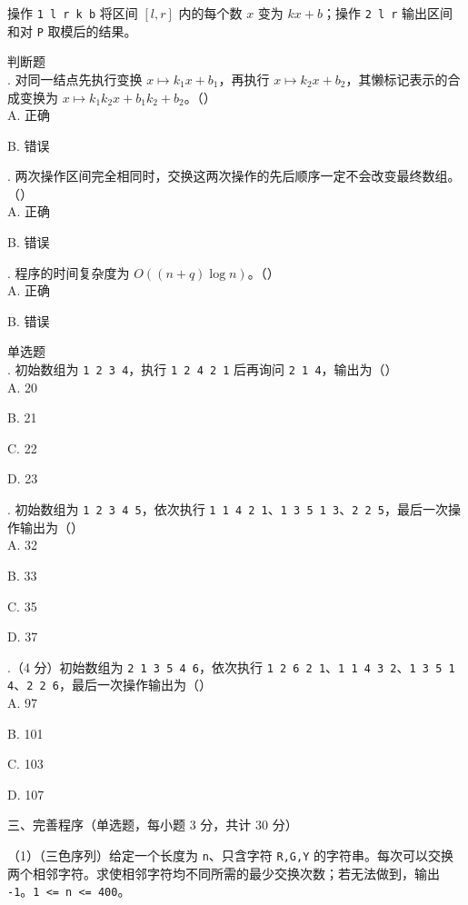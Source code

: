 \documentclass[a4paper]{ctexart}
\newcommand{\wdot}{{\fontsize{12}{12}\selectfont\textbullet}}
\newcommand{\bigtitle}[1]{\noindent\heiti #1\par\vspace{2pt}}
\newcommand{\q}[1]{\noindent #1}
\newcommand{\opt}[1]{\hspace*{2em} #1\par}
\begin{document}
操作 \texttt{1 l r k b} 将区间 \([l,r]\) 内的每个数 \(x\) 变为 \(kx+b\)；操作 \texttt{2 l r} 输出区间和对 \texttt{P} 取模后的结果。

\noindent\wdot\hspace{0.5em}判断题\\
\q{27.} 对同一结点先执行变换 \(x\mapsto k_1x+b_1\)，再执行 \(x\mapsto k_2x+b_2\)，其懒标记表示的合成变换为 \(x\mapsto k_1k_2x+b_1k_2+b_2\)。（\qquad）\\
\opt{A. 正确}\opt{B. 错误}
\q{28.} 两次操作区间完全相同时，交换这两次操作的先后顺序一定不会改变最终数组。（\qquad）\\
\opt{A. 正确}\opt{B. 错误}
\q{29.} 程序的时间复杂度为 \(O((n+q)\log n)\)。（\qquad）\\
\opt{A. 正确}\opt{B. 错误}

\noindent\wdot\hspace{0.5em}单选题\\
\q{30.} 初始数组为 \texttt{1 2 3 4}，执行 \texttt{1 2 4 2 1} 后再询问 \texttt{2 1 4}，输出为（\qquad）\\
\opt{A. 20}\opt{B. 21}\opt{C. 22}\opt{D. 23}
\q{31.} 初始数组为 \texttt{1 2 3 4 5}，依次执行 \texttt{1 1 4 2 1}、\texttt{1 3 5 1 3}、\texttt{2 2 5}，最后一次操作输出为（\qquad）\\
\opt{A. 32}\opt{B. 33}\opt{C. 35}\opt{D. 37}
\q{32.}（4 分）初始数组为 \texttt{2 1 3 5 4 6}，依次执行 \texttt{1 2 6 2 1}、\texttt{1 1 4 3 2}、\texttt{1 3 5 1 4}、\texttt{2 2 6}，最后一次操作输出为（\qquad）\\
\opt{A. 97}\opt{B. 101}\opt{C. 103}\opt{D. 107}

\clearpage
\bigtitle{三、完善程序（单选题，每小题 3 分，共计 30 分）}

\noindent（1）（三色序列）给定一个长度为 \texttt{n}、只含字符 \texttt{R,G,Y} 的字符串。每次可以交换两个相邻字符。求使相邻字符均不同所需的最少交换次数；若无法做到，输出 \texttt{-1}。\texttt{1 <= n <= 400}。
\end{document}
